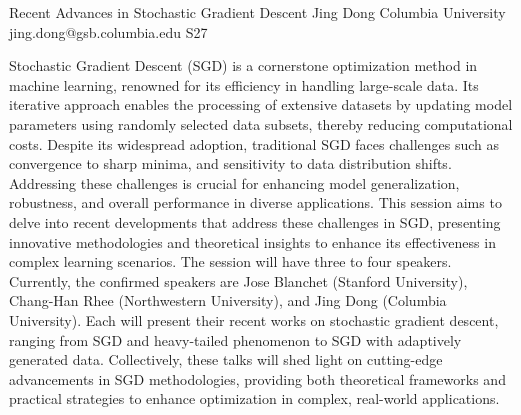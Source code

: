 \begin{session}
 {Recent Advances in Stochastic Gradient Descent}%
 {Jing Dong}%
 {Columbia University}%
 {jing.dong@gsb.columbia.edu}%
{}{}{}
 {S27}%
{}

 Stochastic Gradient Descent (SGD) is a cornerstone optimization method in machine learning,
 renowned for its efficiency in handling large-scale data. Its iterative approach enables
 the processing of extensive datasets by updating model parameters using randomly selected
 data subsets, thereby reducing computational costs. Despite its widespread adoption, traditional
 SGD faces challenges such as convergence to sharp minima, and sensitivity to data
 distribution shifts. Addressing these challenges is crucial for enhancing model generalization,
 robustness, and overall performance in diverse applications. This session aims to delve into
 recent developments that address these challenges in SGD, presenting innovative methodologies
 and theoretical insights to enhance its effectiveness in complex learning scenarios.
 The session will have three to four speakers. Currently, the confirmed speakers are Jose
 Blanchet (Stanford University), Chang-Han Rhee (Northwestern University), and Jing Dong
 (Columbia University). Each will present their recent works on stochastic gradient descent,
 ranging from SGD and heavy-tailed phenomenon to SGD with adaptively generated data.
 Collectively, these talks will shed light on cutting-edge advancements in SGD methodologies,
 providing both theoretical frameworks and practical strategies to enhance optimization in
 complex, real-world applications.
\end{session}

%

\clearpage


